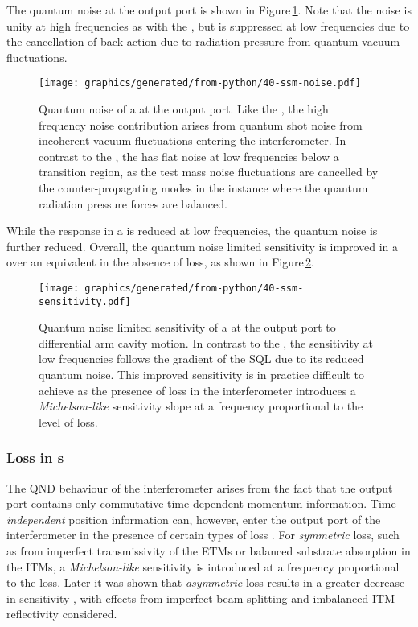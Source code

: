 The quantum noise at the output port is shown in Figure\,\ref{fig:ssm-noise}. Note that the noise is unity at high frequencies as with the \FPMI{}, but is suppressed at low frequencies due to the cancellation of back-action due to radiation pressure from quantum vacuum fluctuations.

\begin{figure}
  \centering
  \texttt{[image: graphics/generated/from-python/40-ssm-noise.pdf]}
  \caption[Quantum noise of a \SSM{} at the output port]{\label{fig:ssm-noise}Quantum noise of a \SSM{} at the output port. Like the \MI{}, the high frequency noise contribution arises from quantum shot noise from incoherent vacuum fluctuations entering the interferometer. In contrast to the \MI{}, the \SSM{} has flat noise at low frequencies below a transition region, as the test mass noise fluctuations are cancelled by the counter-propagating modes in the instance where the quantum radiation pressure forces are balanced.}
\end{figure}

While the response in a \SSM{} is reduced at low frequencies, the quantum noise is further reduced. Overall, the quantum noise limited sensitivity is improved in a \SSM{} over an equivalent \FPMI{} in the absence of loss, as shown in Figure\,\ref{fig:ssm-sensitivity}.

\begin{figure}
  \centering
  \texttt{[image: graphics/generated/from-python/40-ssm-sensitivity.pdf]}
  \caption[Sensitivity of a \SSM{} at the output port to differential arm cavity motion]{\label{fig:ssm-sensitivity}Quantum noise limited sensitivity of a \SSM{} at the output port to differential arm cavity motion. In contrast to the \MI{}, the \SSM{} sensitivity at low frequencies follows the gradient of the \gls{SQL} due to its reduced quantum noise. This improved sensitivity is in practice difficult to achieve as the presence of loss in the interferometer introduces a \emph{Michelson-like} sensitivity slope at a frequency proportional to the level of loss.}
\end{figure}

\subsubsection{Loss in \SSM{}s}
The \gls{QND} behaviour of the interferometer arises from the fact that the output port contains only commutative time-dependent momentum information. Time-\emph{independent} position information can, however, enter the output port of the interferometer in the presence of certain types of loss \cite{Danilishin2004}. For \emph{symmetric} loss, such as from imperfect transmissivity of the \glspl{ETM} or balanced substrate absorption in the \glspl{ITM}, a \emph{Michelson-like} sensitivity is introduced at a frequency proportional to the loss. Later it was shown that \emph{asymmetric} loss results in a greater decrease in sensitivity \cite{Danilishin2015}, with effects from imperfect beam splitting and imbalanced \gls{ITM} reflectivity considered.

